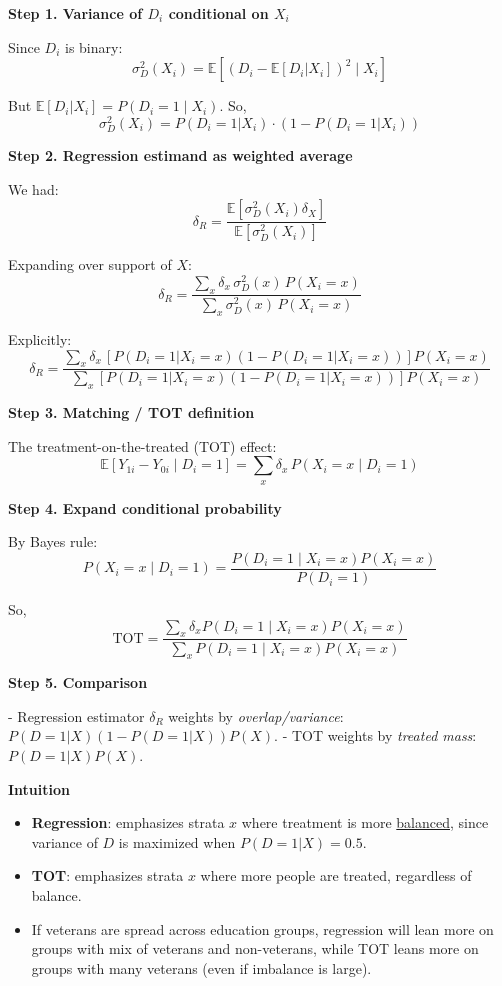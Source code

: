 \documentclass[12pt]{article}
\begin{document}
\textbf{Step 1. Variance of $D_i$ conditional on $X_i$}

Since $D_i$ is binary:
\[
\sigma_D^2(X_i) = \mathbb{E}[(D_i - \mathbb{E}[D_i|X_i])^2 \mid X_i]
\]

But $\mathbb{E}[D_i|X_i] = P(D_i=1 \mid X_i)$.  
So,
\[
\sigma_D^2(X_i) = P(D_i=1|X_i) \cdot (1-P(D_i=1|X_i))
\]

\textbf{Step 2. Regression estimand as weighted average}

We had:
\[
\delta_R = \frac{\mathbb{E}[\sigma_D^2(X_i)\delta_X]}{\mathbb{E}[\sigma_D^2(X_i)]}
\]

Expanding over support of $X$:
\[
\delta_R = \frac{\sum_x \delta_x \, \sigma_D^2(x) \, P(X_i=x)}{\sum_x \sigma_D^2(x) \, P(X_i=x)}
\]

Explicitly:
\[
\delta_R = \frac{\sum_x \delta_x \, [P(D_i=1|X_i=x)(1-P(D_i=1|X_i=x))] P(X_i=x)}{\sum_x [P(D_i=1|X_i=x)(1-P(D_i=1|X_i=x))] P(X_i=x)}
\]

\hfill \textbf{}

\textbf{Step 3. Matching / TOT definition}

The treatment-on-the-treated (TOT) effect:
\[
\mathbb{E}[Y_{1i} - Y_{0i} \mid D_i=1] = \sum_x \delta_x \, P(X_i=x \mid D_i=1)
\]

\textbf{Step 4. Expand conditional probability}

By Bayes rule:
\[
P(X_i=x \mid D_i=1) = \frac{P(D_i=1 \mid X_i=x) P(X_i=x)}{P(D_i=1)}
\]

So,
\[
\text{TOT} = \frac{\sum_x \delta_x P(D_i=1 \mid X_i=x) P(X_i=x)}{\sum_x P(D_i=1 \mid X_i=x) P(X_i=x)}
\]

\hfill \textbf{}


\textbf{Step 5. Comparison}

- Regression estimator $\delta_R$ weights by \textit{overlap/variance}: $P(D=1|X)(1-P(D=1|X))P(X)$.  
- TOT weights by \textit{treated mass}: $P(D=1|X)P(X)$.  

\textbf{Intuition}

\begin{itemize}
    \item \textbf{Regression}: emphasizes strata $x$ where treatment is more \underline{balanced}, since variance of $D$ is maximized when $P(D=1|X)=0.5$.
    \item \textbf{TOT}: emphasizes strata $x$ where more people are treated, regardless of balance.
    \item If veterans are spread across education groups, regression will lean more on groups with mix of veterans and non-veterans, while TOT leans more on groups with many veterans (even if imbalance is large).
\end{itemize}
\end{document}
